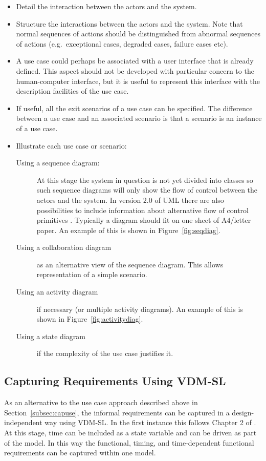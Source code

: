 \documentclass{overturerepchap}
\begin{document}
\begin{itemize}
\item Detail the interaction between the actors and the system.
\item Structure the interactions between the actors and the
system. Note that normal sequences of actions should be distinguished
from abnormal sequences of actions (e.g.\ exceptional cases, degraded
cases, failure cases etc).
\item A use case could perhaps be associated with a user interface
that is already defined. This aspect should not be developed with
particular concern to the human-computer interface, but it is useful
to represent this interface with the description facilities of the use
case.
\item If useful, all the exit scenarios of a use case can be
specified. The difference between a use case and an associated
scenario is that a scenario is an instance of a use case.
\item Illustrate each use case or scenario:
\begin{description}
\item[Using a sequence diagram:] At this stage the system in question
is not yet divided into classes so such sequence diagrams will only
show the flow of control between the actors and the system. In version
2.0 of UML there are also possibilities to include information about
alternative flow of control primitives \cite{UML20}. Typically a
diagram should fit on one sheet of A4/letter paper. An example of this
is shown in Figure~\ref{fig:seqdiag}.
\item[Using a collaboration diagram] as an alternative view of the
sequence diagram. This allows representation of a simple scenario.
\item[Using an activity diagram] if necessary (or multiple activity
diagrams). An example of this is shown in
Figure~\ref{fig:activitydiag}.
\item[Using a state diagram] if the complexity of the use case
justifies it.
\end{description}
\end{itemize}

\subsection{Capturing Requirements Using VDM-SL}\label{subsec:captureVDM}
\label{subsec:VDMSL}

As an alternative to the use case approach described above in
Section~\ref{subsec:capuse}, the informal requirements can be captured
in a design-independent way using VDM-SL. In the first instance this
follows Chapter 2 of \cite{Fitzgerald&98b,Fitzgerald&05,Fitzgerald&09}. At this
stage, time can be included as a state variable and can be driven as
part of the model. In this way the functional, timing, and
time-dependent functional requirements can be captured within one
model.
\end{document}

